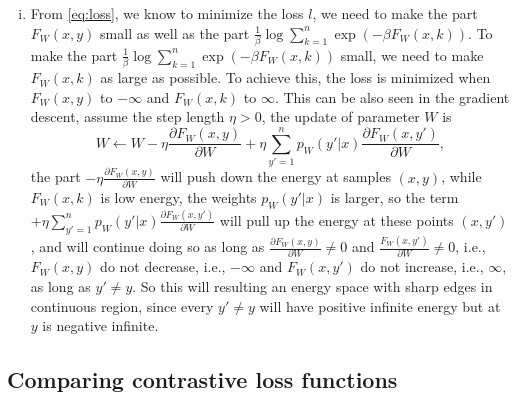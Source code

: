 \documentclass[10pt,a4paper]{article}
\theoremstyle{dotlessP}
\begin{document}
\begin{enumerate}[(i)]
	\item From \eqref{eq:loss}, we know to minimize the loss $l$, we need to make the part $F_W(x,y)$ small as well as the part $ \frac{1}{\beta}\log \sum\limits_{k=1}^{n}\exp(-\beta F_W(x,k)) $. To make the part $ \frac{1}{\beta}\log \sum\limits_{k=1}^{n}\exp(-\beta F_W(x,k)) $ small, we need to make $F_W(x,k)$ as large as possible. To achieve this, the loss is minimized when $F_W(x,y)$ to $-\infty$ and $F_W(x,k)$ to $\infty$. This can be also seen in the gradient descent, assume the step length $\eta>0$, the update of parameter $W$ is 
	\begin{equation}
	W \leftarrow W - \eta \frac{\partial F_W(x,y)}{\partial W} + \eta  \sum\limits_{y'=1}^{n}  p_W(y'|x) \frac{\partial F_W(x,y')}{\partial W},
	\end{equation}
	the part $- \eta \frac{\partial F_W(x,y)}{\partial W}$ will push down the energy at samples $(x,y)$, while $F_W(x, k)$ is low energy, the weights $p_W(y'|x)$ is larger, so the term $+ \eta  \sum\limits_{y'=1}^{n}  p_W(y'|x) \frac{\partial F_W(x,y')}{\partial W}$ will pull up the energy at these points $(x,y')$, and will continue doing so as long as $\frac{\partial F_W(x,y)}{\partial W} \neq 0$ and $\frac{F_W(x,y')}{\partial W} \neq 0$, i.e., $F_W(x,y)$ do not decrease, i.e., $-\infty$ and $F_W(x,y')$ do not increase, i.e., $\infty$, as long as $y'\neq y$. So this will resulting an energy space with sharp edges in continuous region, since every $y'\neq y$ will have positive infinite energy but at $y$ is negative infinite.
	
\end{enumerate}


\subsection{Comparing contrastive loss functions}
\end{document}

